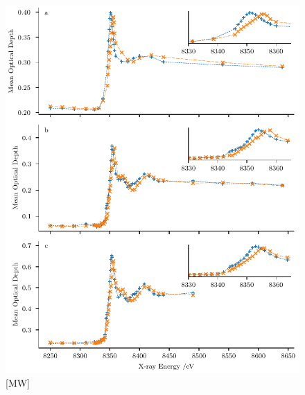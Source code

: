 \documentclass{article}
\begin{document}
\begin{figure}
  \includegraphics{figures/Kedges.pdf}
  \caption{[MW] }
  \label{fig:kedges}
\end{figure}
\end{document}

